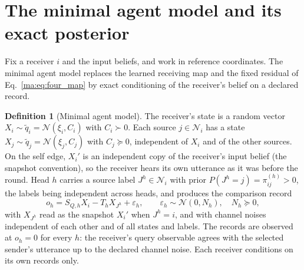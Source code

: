 \documentclass[11pt]{article}
\theoremstyle{definition}
\newtheorem{definition}[theorem]{Definition}
\theoremstyle{remark}
\newcommand{\Nset}{\mathcal N}
\newcommand{\Gauss}{\mathcal N}
\newcommand{\qt}{\widetilde q}
\begin{document}
\section{The minimal agent model and its exact posterior}
\label{ma:sec:model}

Fix a receiver $i$ and the input beliefs, and work in reference coordinates. The minimal agent model replaces the learned receiving map and the fixed residual of Eq.~\eqref{ma:eq:four_map} by exact conditioning of the receiver's belief on a declared record.

\begin{definition}[Minimal agent model]
\label{ma:def:model}
The receiver's state is a random vector $X_i\sim\qt_i=\Gauss(\xi_i,C_i)$ with $C_i\succ0$. Each source $j\in\Nset_i$ has a state $X_j\sim\qt_j=\Gauss(\xi_j,C_j)$ with $C_j\succeq0$, independent of $X_i$ and of the other sources. On the self edge, $X_i'$ is an independent copy of the receiver's input belief (the snapshot convention), so the receiver hears its own utterance as it was before the round. Head $h$ carries a source label $J^h\in\Nset_i$ with prior $P(J^h=j)=\pi^{(h)}_{ij}>0$, the labels being independent across heads, and produces the comparison record
\begin{equation}
o_h=S_{Q,h}X_i-T_hX_{J^h}+\varepsilon_h,\qquad\varepsilon_h\sim\Gauss(0,N_h),\quad N_h\succeq0,
\label{ma:eq:record}
\end{equation}
with $X_{J^h}$ read as the snapshot $X_i'$ when $J^h=i$, and with channel noises independent of each other and of all states and labels. The records are observed at $o_h=0$ for every $h$: the receiver's query observable agrees with the selected sender's utterance up to the declared channel noise. Each receiver conditions on its own records only.
\end{definition}
\end{document}
